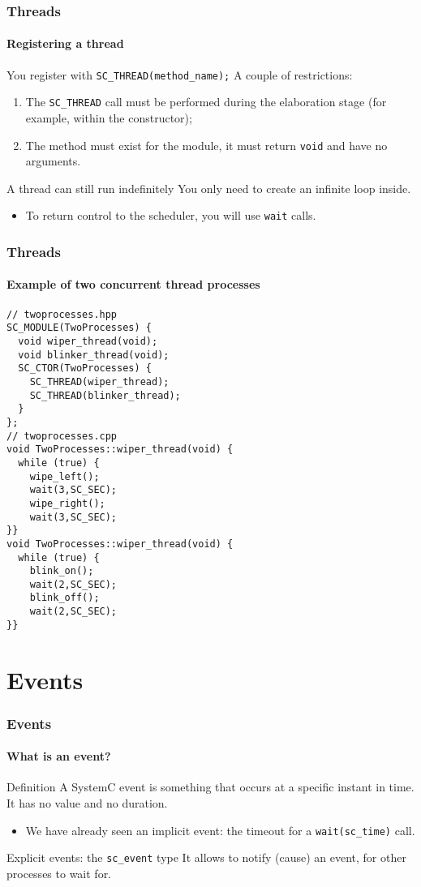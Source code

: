 \begin{frame}
\frametitle{Threads}
\framesubtitle{Registering a thread}

\begin{block}{You register with \texttt{SC\_THREAD(method\_name);}}
A couple of restrictions:
\begin{enumerate}
\item The \texttt{SC\_THREAD} call must be performed during the elaboration stage (for example, within the constructor);
\item The method must exist for the module, it must return \texttt{void} and have no arguments.
\end{enumerate}
\end{block}
\pause
\begin{block}{A thread can still run indefinitely}
You only need to create an infinite loop inside.
\begin{itemize}
\item To return control to the scheduler, you will use \texttt{wait} calls.
\end{itemize}
\end{block}
\end{frame}

\begin{frame}[fragile]
\frametitle{Threads}
\framesubtitle{Example of two concurrent thread processes}

{\scriptsize 
\begin{verbatim}
// twoprocesses.hpp
SC_MODULE(TwoProcesses) {
  void wiper_thread(void);
  void blinker_thread(void);
  SC_CTOR(TwoProcesses) {
    SC_THREAD(wiper_thread);
    SC_THREAD(blinker_thread);
  }
};
// twoprocesses.cpp
void TwoProcesses::wiper_thread(void) {
  while (true) {
    wipe_left();
    wait(3,SC_SEC);
    wipe_right();
    wait(3,SC_SEC);
}}
void TwoProcesses::wiper_thread(void) {
  while (true) {
    blink_on();
    wait(2,SC_SEC);
    blink_off();
    wait(2,SC_SEC);
}}
\end{verbatim}
}

\end{frame}

\section{Events}

\begin{frame}
\frametitle{Events}
\framesubtitle{What is an event?}

\begin{block}{Definition}
A SystemC event is something that occurs at a specific instant in time. It has no value and no duration.
\begin{itemize}
\item We have already seen an implicit event: the timeout for a \texttt{wait(sc\_time)} call.
\end{itemize}
\end{block}
\pause
\begin{block}{Explicit events: the \texttt{sc\_event} type}
It allows to notify (cause) an event, for other processes to wait for.
\end{block}

\end{frame}

